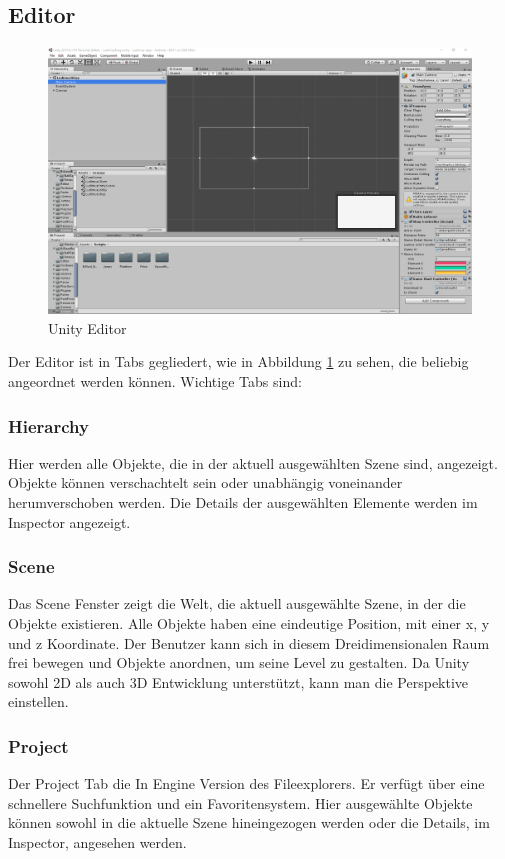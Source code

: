 \subsection{Editor}
\begin{figure}
    \includegraphics[scale=0.35]{images/unityEditor.png} 
    \caption{Unity Editor}
    \label{img:unity-editor}
\end{figure}

Der Editor ist in Tabs gegliedert, wie in Abbildung \ref{img:unity-editor} zu sehen, die beliebig angeordnet werden können. Wichtige Tabs sind:
\subsubsection{Hierarchy}
Hier werden alle Objekte, die in der aktuell ausgewählten Szene sind, angezeigt. Objekte können verschachtelt sein oder unabhängig voneinander herumverschoben werden. Die Details der ausgewählten Elemente werden im Inspector angezeigt.
\subsubsection{Scene}
Das Scene Fenster zeigt die Welt, die aktuell ausgewählte Szene, in der die Objekte existieren. Alle Objekte haben eine eindeutige Position, mit einer x, y und z Koordinate. Der Benutzer kann sich in diesem Dreidimensionalen Raum frei bewegen und Objekte anordnen, um seine Level zu gestalten. Da Unity sowohl 2D als auch 3D Entwicklung unterstützt, kann man die Perspektive einstellen.
\subsubsection{Project}
Der Project Tab die In Engine Version des Fileexplorers. Er verfügt über eine schnellere Suchfunktion und ein Favoritensystem. Hier ausgewählte Objekte können sowohl in die aktuelle Szene hineingezogen werden oder die Details, im Inspector, angesehen werden.
